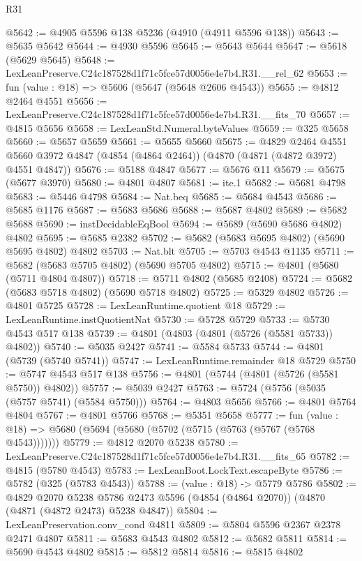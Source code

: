 \begin{lexlean}{R31}
\begin{coremodule}
@5642 := @4905 @5596 @138 @5236 (@4910 (@4911 @5596 @138))
@5643 := @5635 @5642
@5644 := @4930 @5596
@5645 := @5643 @5644
@5647 := @5618 (@5629 @5645)
@5648 := LexLeanPreserve.C24c187528d1f71c5fce57d0056e4e7b4.R31.__rel_62
@5653 := fun (value : @18) => @5606 (@5647 (@5648 @2606 @4543))
@5655 := @4812 @2464 @4551
@5656 := LexLeanPreserve.C24c187528d1f71c5fce57d0056e4e7b4.R31.__fits_70
@5657 := @4815 @5656
@5658 := LexLeanStd.Numeral.byteValues
@5659 := @325 @5658
@5660 := @5657 @5659
@5661 := @5655 @5660
@5675 := @4829
    @2464
    @4551
    @5660
    @3972
    @4847
    (@4854 (@4864 @2464))
    (@4870 (@4871 (@4872 @3972) @4551 @4847))
@5676 := @5188 @4847
@5677 := @5676 @11
@5679 := @5675 (@5677 @3970)
@5680 := @4801 @4807
@5681 := ite.{1}
@5682 := @5681 @4798
@5683 := @5446 @4798
@5684 := Nat.beq
@5685 := @5684 @4543
@5686 := @5685 @1176
@5687 := @5683 @5686
@5688 := @5687 @4802
@5689 := @5682 @5688
@5690 := instDecidableEqBool
@5694 := @5689 (@5690 @5686 @4802) @4802
@5695 := @5685 @2382
@5702 := @5682 (@5683 @5695 @4802) (@5690 @5695 @4802) @4802
@5703 := Nat.blt
@5705 := @5703 @4543 @1135
@5711 := @5682 (@5683 @5705 @4802) (@5690 @5705 @4802)
@5715 := @4801 (@5680 (@5711 @4804 @4807))
@5718 := @5711 @4802 (@5685 @2408)
@5724 := @5682 (@5683 @5718 @4802) (@5690 @5718 @4802)
@5725 := @5329 @4802
@5726 := @4801 @5725
@5728 := LexLeanRuntime.quotient @18
@5729 := LexLeanRuntime.instQuotientNat
@5730 := @5728 @5729
@5733 := @5730 @4543 @517 @138
@5739 := @4801 (@4803 (@4801 (@5726 (@5581 @5733)) @4802))
@5740 := @5035 @2427
@5741 := @5584 @5733
@5744 := @4801 (@5739 (@5740 @5741))
@5747 := LexLeanRuntime.remainder @18 @5729
@5750 := @5747 @4543 @517 @138
@5756 := @4801 (@5744 (@4801 (@5726 (@5581 @5750)) @4802))
@5757 := @5039 @2427
@5763 := @5724 (@5756 (@5035 (@5757 @5741) (@5584 @5750)))
@5764 := @4803 @5656
@5766 := @4801 @5764 @4804
@5767 := @4801 @5766
@5768 := @5351 @5658
@5777 := fun (value : @18) => @5680 (@5694 (@5680 (@5702 (@5715 (@5763 (@5767 (@5768 @4543)))))))
@5779 := @4812 @2070 @5238
@5780 := LexLeanPreserve.C24c187528d1f71c5fce57d0056e4e7b4.R31.__fits_65
@5782 := @4815 (@5780 @4543)
@5783 := LexLeanBoot.LockText.escapeByte
@5786 := @5782 (@325 (@5783 @4543))
@5788 := (value : @18) -> @5779 @5786
@5802 := @4829
    @2070
    @5238
    @5786
    @2473
    @5596
    (@4854 (@4864 @2070))
    (@4870 (@4871 (@4872 @2473) @5238 @4847))
@5804 := LexLeanPreservation.conv_cond @4811
@5809 := @5804 @5596 @2367 @2378 @2471 @4807
@5811 := @5683 @4543 @4802
@5812 := @5682 @5811
@5814 := @5690 @4543 @4802
@5815 := @5812 @5814
@5816 := @5815 @4802

\end{coremodule}
\end{lexlean}
